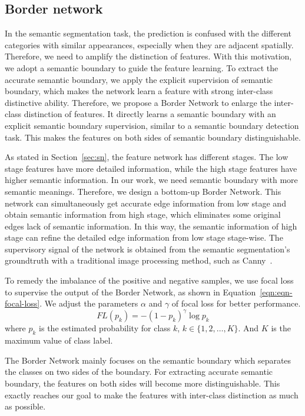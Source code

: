 \documentclass[10pt,twocolumn,letterpaper]{article}
\begin{document}
\subsection{Border network}
In the semantic segmentation task, the prediction is confused with the different categories with similar appearances, especially when they are adjacent spatially. Therefore, we need to amplify the distinction of features. With this motivation, we adopt a semantic boundary to guide the feature learning. To extract the accurate semantic boundary, we apply the explicit supervision of semantic boundary, which makes the network learn a feature with strong inter-class distinctive ability.  Therefore, we propose a Border Network to enlarge the inter-class distinction of features. It directly learns a semantic boundary with an explicit semantic boundary supervision, similar to a semantic boundary detection task. This makes the features on both sides of semantic boundary distinguishable.

As stated in Section~\ref{sec:sn}, the feature network has different stages. The low stage features have more detailed information, while the high stage features have higher semantic information. In our work, we need semantic boundary with more semantic meanings. Therefore, we design a bottom-up Border Network. This network can simultaneously get accurate edge information from low stage and obtain semantic information from high stage, which eliminates some original edges lack of semantic information. In this way, the semantic information of high stage can refine the detailed edge information from low stage stage-wise. The supervisory signal of the network is obtained from the semantic segmentation's groundtruth with a traditional image processing method, such as Canny~\cite{Canny-PAMI-Canny-1986}. 

To remedy the imbalance of the positive and negative samples, we use focal loss~\cite{Lin-ICCV-Focal-2017} to supervise the output of the Border Network, as shown in Equation~\ref{eqn:eqn-focal-loss}. We adjust the parameters $\alpha$ and $\gamma$ of focal loss for better performance.
\begin{equation}
\label{eqn:eqn-focal-loss}
FL(p_k) = -(1-p_k)^{\gamma}\log{p_k}
\end{equation}
where $p_k$ is the estimated probability for class $k$, $k \in \{1, 2, \ldots, K\}$. And $K$ is the maximum value of class label.


The Border Network mainly focuses on the semantic boundary which separates the classes on two sides of the boundary. For extracting accurate semantic boundary, the features on both sides will become more distinguishable. This exactly reaches our goal to make the features with inter-class distinction as much as possible.
\end{document}
